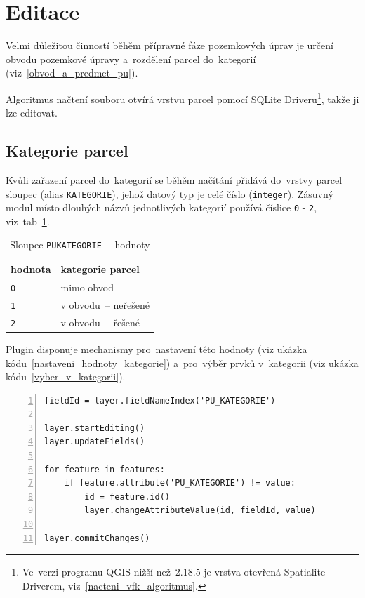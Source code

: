 \newpage

\section{Editace}
\label{editace}

Velmi důležitou činností běhěm přípravné fáze pozemkových úprav je určení obvodu pozemkové úpravy a~rozdělení parcel do~kategorií (viz~\ref{obvod_a_predmet_pu}).

Algoritmus načtení  souboru otvírá vrstvu parcel pomocí SQLite Driveru\footnote{Ve~verzi programu QGIS nižší než~2.18.5 je vrstva otevřená Spatialite Driverem, viz~\ref{nacteni_vfk_algoritmus}.}, takže ji lze editovat.

\subsection{Kategorie parcel}
\label{kategorie_parcel}

Kvůli zařazení parcel do~kategorií se běhěm načítání přidává do~vrstvy parcel sloupec \texttt{} (alias \texttt{KATEGORIE}), jehož datový typ je celé číslo (\texttt{integer}). Zásuvný modul místo dlouhých názvů jednotlivých kategorií používá číslice \texttt{0} - \texttt{2}, viz~tab~\ref{tab:kategorie_hodnoty}. 

\begin{table}[H]
    \begin{tabular}{|l|l|}
        \hline
         hodnota & kategorie parcel \\
        \hline
        \hline
          \texttt{0} & mimo obvod \\ \hline
          \texttt{1} & v obvodu~– neřešené \\ \hline          
          \texttt{2} & v obvodu~– řešené \\
         \hline
    \end{tabular}
    \centering
    \caption[Sloupec \texttt{PU\textunderscore KATEGORIE}~– hodnoty]{Sloupec \texttt{PU\textunderscore KATEGORIE}~– hodnoty}
    \label{tab:kategorie_hodnoty}
\end{table}

Plugin disponuje mechanismy pro~nastavení této hodnoty (viz ukázka kódu~\ref{nastaveni_hodnoty_kategorie}) a~pro~výběr prvků v~kategorii (viz ukázka kódu~\ref{vyber_v_kategorii}).

{\scriptsize
\begin{lstlisting}[style=python, caption={Kategorie parcel~– nastavení hodnoty}, captionpos=b, label=nastaveni_hodnoty_kategorie, backgroundcolor = \color{light-gray},  numbers=left]
fieldId = layer.fieldNameIndex('PU_KATEGORIE')

layer.startEditing()
layer.updateFields()

for feature in features:
    if feature.attribute('PU_KATEGORIE') != value:
        id = feature.id()
        layer.changeAttributeValue(id, fieldId, value)

layer.commitChanges()
\end{lstlisting}}

